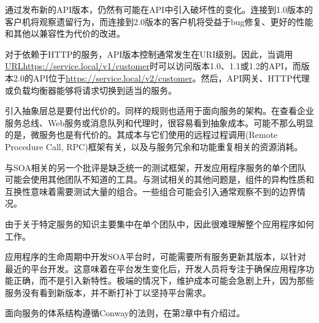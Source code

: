 通过发布新的API版本，仍然有可能在API中引入破坏性的变化。连接到1.0版本的客户机将观察遗留行为，而连接到2.0版本的客户机将受益于bug修复、更好的性能和其他以兼容性为代价的改进。

对于依赖于HTTP的服务，API版本控制通常发生在URI级别。因此，当调用\url{URLhttps://service.local/v1/customer}时可以访问版本1.0、1.1或1.2的API，而版本2.0的API位于\url{https://service.local/v2/customer}。然后，API网关、HTTP代理或负载均衡器能够将请求切换到适当的服务。


引入抽象层总是要付出代价的。同样的规则也适用于面向服务的架构。在查看企业服务总线、Web服务或消息队列和代理时，很容易看到抽象成本。可能不那么明显的是，微服务也是有代价的。其成本与它们使用的远程过程调用(Remote Procedure Call, RPC)框架有关，以及与服务冗余和功能重复相关的资源消耗。 

与SOA相关的另一个批评是缺乏统一的测试框架，开发应用程序服务的单个团队可能会使用其他团队不知道的工具。与测试相关的其他问题是，组件的异构性质和互换性意味着需要测试大量的组合。一些组合可能会引入通常观察不到的边界情况。

由于关于特定服务的知识主要集中在单个团队中，因此很难理解整个应用程序如何工作。

应用程序的生命周期中开发SOA平台时，可能需要所有服务更新其版本，以针对最近的平台开发。这意味着在平台发生变化后，开发人员将专注于确保应用程序功能正确，而不是引入新特性。极端的情况下，维护成本可能会急剧上升，因为那些服务没有看到新版本，并不断打补丁以坚持平台需求。

面向服务的体系结构遵循Conway的法则，在第2章中有介绍过。






